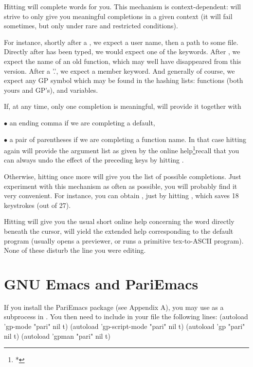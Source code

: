   Hitting
 will complete words for you. This mechanism is context-dependent:
 will strive to only give you meaningful completions in a given
context (it will fail sometimes, but only under rare and restricted
conditions).

  For instance, shortly after a \kbd{\til}, we expect a user name, then a
path to some file. Directly after  has been typed, we would
expect one of the  keywords. After  , we expect
the name of an old function, which may well have disappeared from this
version. After a '.', we expect a member keyword. And generally of course, we
expect any GP symbol which may be found in the hashing lists: functions (both
yours and GP's), and variables.

  If, at any time, only one completion is meaningful,  will provide it
together with

$\bullet$ an ending comma if we are completing a default,

$\bullet$ a pair of parentheses if we are completing a function name. In
that case hitting  again will provide the argument list as given
by the online help\footnote{*}{recall that you can always undo the effect
of the preceding keys by hitting }.

Otherwise, hitting  once more will give you the list of possible
completions. Just experiment with this mechanism as often as possible,
you will probably find it very convenient. For instance, you can obtain
, just by hitting ,
which saves 18 keystrokes (out of 27).

  Hitting  will give you the usual short online help concerning the
word directly beneath the cursor,  will yield the extended help
corresponding to the  default program (usually opens a 
previewer, or runs a primitive tex-to-ASCII program). None of these disturb
the line you were editing.

\section{GNU Emacs and PariEmacs}
\label{se:emacs}

If you install the PariEmacs package (see Appendix A), you may use 
as a subprocess in . You then need to include in your 
file the following lines:
\bprog
  (autoload 'gp-mode "pari" nil t)
  (autoload 'gp-script-mode "pari" nil t)
  (autoload 'gp "pari" nil t)
  (autoload 'gpman "pari" nil t)

